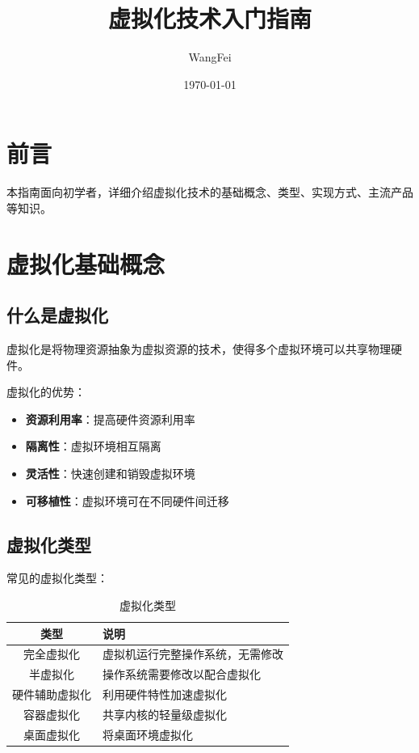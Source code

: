 \documentclass[12pt,UTF8]{ctexbook}
\title{\heiti\zihao{0} 虚拟化技术入门指南}
\author{WangFei}
\date{\today}
\begin{document}
\maketitle
\tableofcontents

\frontmatter
\chapter{前言}

本指南面向初学者，详细介绍虚拟化技术的基础概念、类型、实现方式、主流产品等知识。

\mainmatter

\chapter{虚拟化基础概念}
\label{chap:virtualization_basics}

\section{什么是虚拟化}
\label{sec:what_is_virtualization}

虚拟化是将物理资源抽象为虚拟资源的技术，使得多个虚拟环境可以共享物理硬件。

虚拟化的优势：
\begin{itemize}
    \item \textbf{资源利用率}：提高硬件资源利用率
    \item \textbf{隔离性}：虚拟环境相互隔离
    \item \textbf{灵活性}：快速创建和销毁虚拟环境
    \item \textbf{可移植性}：虚拟环境可在不同硬件间迁移
\end{itemize}

\section{虚拟化类型}
\label{sec:virtualization_types}

常见的虚拟化类型：
\begin{table}[htbp]
    \centering
    \caption{虚拟化类型}
    \begin{tabular}{|c|p{8cm}|}
        \hline
        \textbf{类型} & \textbf{说明} \\
        \hline
        完全虚拟化 & 虚拟机运行完整操作系统，无需修改 \\
        \hline
        半虚拟化 & 操作系统需要修改以配合虚拟化 \\
        \hline
        硬件辅助虚拟化 & 利用硬件特性加速虚拟化 \\
        \hline
        容器虚拟化 & 共享内核的轻量级虚拟化 \\
        \hline
        桌面虚拟化 & 将桌面环境虚拟化 \\
        \hline
    \end{tabular}
\end{table}
\end{document}
